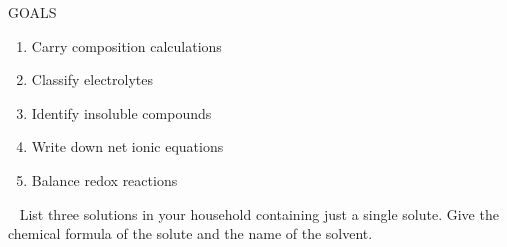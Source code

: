 \documentclass[main.tex]{subfiles} %
\begin{document}
\begin{marginfigure}%
\begin{mytcbox}{GOALS}
\begin{enumerate}[label=\protect\circled{\color{white}\arabic*}]
\item Carry composition calculations
\item Classify electrolytes
\item Identify insoluble compounds
\item Write down net ionic equations
\item Balance redox reactions
\end{enumerate}
\end{mytcbox}
\vspace{1cm}
\begin{tcolorbox}[enhanced,colback=red!5!white,colframe=black!50!red,boxrule=1pt,
  arc=0pt,outer arc=0pt,drop heavy lifted shadow]
\faGears\ 
 List three solutions in your household containing just a single solute. Give the chemical formula of the solute and the name of the solvent. \end{tcolorbox}
\end{marginfigure}%
\end{document}
